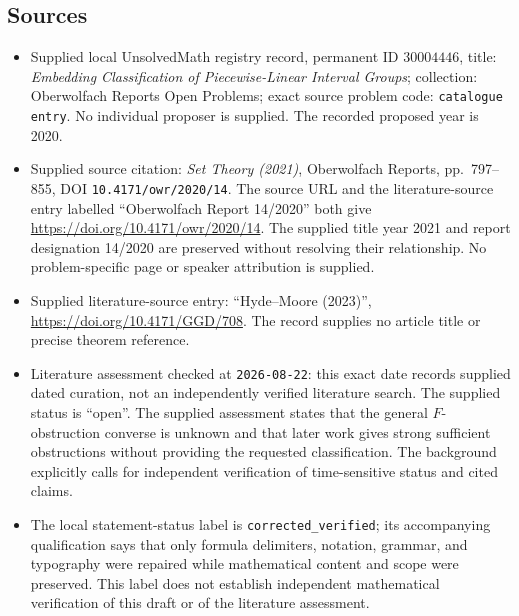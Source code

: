 \documentclass[11pt]{article}
\begin{document}
\subsection{Sources}
\begin{itemize}
\item Supplied local UnsolvedMath registry record, permanent ID \(30004446\), title: \emph{Embedding Classification of Piecewise-Linear Interval Groups}; collection: Oberwolfach Reports Open Problems; exact source problem code: \texttt{catalogue entry}. No individual proposer is supplied. The recorded proposed year is 2020.
\item Supplied source citation: \emph{Set Theory (2021)}, Oberwolfach Reports, pp.\ 797--855, DOI \texttt{10.4171/owr/2020/14}. The source URL and the literature-source entry labelled ``Oberwolfach Report 14/2020'' both give \url{https://doi.org/10.4171/owr/2020/14}. The supplied title year 2021 and report designation 14/2020 are preserved without resolving their relationship. No problem-specific page or speaker attribution is supplied.
\item Supplied literature-source entry: ``Hyde--Moore (2023)'', \url{https://doi.org/10.4171/GGD/708}. The record supplies no article title or precise theorem reference.
\item Literature assessment checked at \texttt{2026-08-22}: this exact date records supplied dated curation, not an independently verified literature search. The supplied status is ``open''. The supplied assessment states that the general \(F\)-obstruction converse is unknown and that later work gives strong sufficient obstructions without providing the requested classification. The background explicitly calls for independent verification of time-sensitive status and cited claims.
\item The local statement-status label is \texttt{corrected\_verified}; its accompanying qualification says that only formula delimiters, notation, grammar, and typography were repaired while mathematical content and scope were preserved. This label does not establish independent mathematical verification of this draft or of the literature assessment.
\end{itemize}
\end{document}
